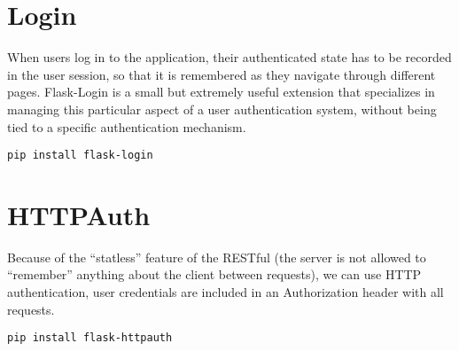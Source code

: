 \section{Login}
\label{sec:login}

When users log in to the application, their authenticated state has to be recorded in the user session, so that it is remembered as they navigate through different pages. Flask-Login is a small but extremely useful extension that specializes in managing this particular aspect of a user authentication system, without being tied to a specific authentication mechanism.

\begin{lstlisting}
pip install flask-login
\end{lstlisting}

\section{HTTPAuth}
\label{sec:httpauth}

Because of the ``statless'' feature of the RESTful (the server is not allowed to “remember” anything about the client between requests), we can use HTTP authentication, user credentials are included in an Authorization header with all requests.


\begin{lstlisting}
pip install flask-httpauth
\end{lstlisting}
